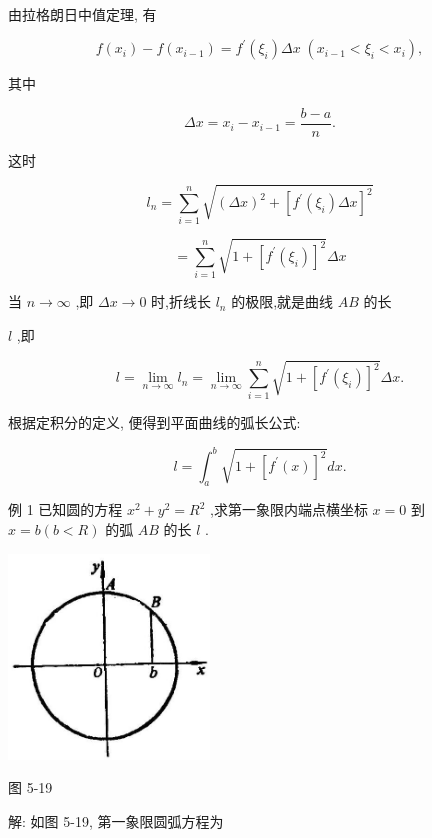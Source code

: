 \documentclass[lang=cn,newtx,12pt,scheme=chinese]{elegantbook}
\begin{document}
由拉格朗日中值定理, 有

\[
f\left( {x}_{i}\right) - f\left( {x}_{i - 1}\right) = {f}^{\prime }\left( {\xi }_{i}\right) {\Delta x}\;\left( {{x}_{i - 1} < {\xi }_{i} < {x}_{i}}\right) ,
\]

其中

\[
{\Delta x} = {x}_{i} - {x}_{i - 1} = \frac{b - a}{n}.
\]

这时

\[
{l}_{n} = \mathop{\sum }\limits_{{i = 1}}^{n}\sqrt{{\left( \Delta x\right) }^{2} + {\left\lbrack {f}^{\prime }\left( {\xi }_{i}\right) \Delta x\right\rbrack }^{2}}
\]

\[
= \mathop{\sum }\limits_{{i = 1}}^{n}\sqrt{1 + {\left\lbrack {f}^{\prime }\left( {\xi }_{i}\right) \right\rbrack }^{2}}{\Delta x}
\]

当 \(n \rightarrow \infty\) ,即 \({\Delta x} \rightarrow 0\) 时,折线长 \({l}_{n}\) 的极限,就是曲线 \({AB}\) 的长

\(l\) ,即

\[
l = \mathop{\lim }\limits_{{n \rightarrow \infty }}{l}_{n} = \mathop{\lim }\limits_{{n \rightarrow \infty }}\mathop{\sum }\limits_{{i = 1}}^{n}\sqrt{1 + {\left\lbrack {f}^{\prime }\left( {\xi }_{i}\right) \right\rbrack }^{2}}{\Delta x}.
\]

根据定积分的定义, 便得到平面曲线的弧长公式:

\[
l = {\int }_{a}^{b}\sqrt{1 + {\left\lbrack {f}^{\prime }\left( x\right) \right\rbrack }^{2}}{dx}.
\]

例 1 已知圆的方程 \({x}^{2} + {y}^{2} = {R}^{2}\) ,求第一象限内端点横坐标 \(x = 0\) 到 \(x = b\left( {b < R}\right)\) 的弧 \({AB}\) 的长 \(l\) .

\begin{center}
\includegraphics[max width=0.4\textwidth]{images/01912c18-5c3f-733d-b775-749ba9897a9d_242_691071.jpg}
\end{center}

图 5-19

解: 如图 5-19, 第一象限圆弧方程为
\end{document}

